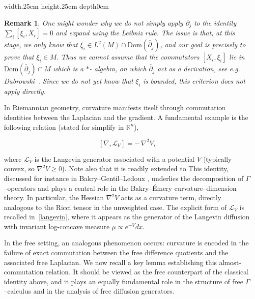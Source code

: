 \documentclass[10pt,a4paper,reqno]{amsart}
\newtheorem{remark}[theorem]{Remark}
\def\qed{ \hfill \vrule width.25cm height.25cm depth0cm\smallskip}
\newcommand{\Dom}{\mathrm{Dom}}
\begin{document}
\qed
\begin{remark}
One might wonder why we do not simply apply $\bar\partial_j$ to the identity
$\sum_i [\xi_i,X_i]=0$ and expand using the Leibniz rule.  The issue is that,
at this stage, we only know that $\xi_i\in L^2(M)\cap\Dom(\bar\partial_j)$, and
our goal is precisely to prove that $\xi_i\in M$.  Thus we cannot assume that
the commutators $[X_i,\xi_i]$ lie in $\Dom(\bar\partial_j)\cap M$ which is a $*$- algebra, on which $\bar\partial_j$ act as a derivation, see e.g. Dabrowski~\cite[Proposition~6]{Dab10}. Since we do not yet know that $\xi_i$ is bounded, this criterion does not apply directly.
\end{remark}

\begin{flushleft}
In Riemannian geometry, curvature manifests itself through commutation identities between the
Laplacian and the gradient.  A fundamental example is the following relation (stated for simplify in $\mathbb R^n$), 


\[
[\nabla, \mathcal{L}_V] = -\,\nabla^2 V,
\]


where $\mathcal{L}_V$ is the Langevin generator associated with a potential $V$ (typically convex, so
$\nabla^2 V\ge 0$). Note also that it is readily extended to   This identity, discussed for instance in Bakry--Gentil--Ledoux
\cite[p.~104]{Ledoux}, underlies the decomposition of $\Gamma$--operators and plays a central role
in the Bakry--Émery curvature--dimension theory.  In particular, the Hessian $\nabla^2 V$ acts as a
curvature term, directly analogous to the Ricci tensor in the unweighted case.  The explicit form of
$\mathcal{L}_V$ is recalled in~\eqref{langevin}, where it appears as the generator of the Langevin diffusion
with invariant log-concave measure $\mu \propto e^{-V}dx$.

\medskip

In the free setting, an analogous phenomenon occurs: curvature is encoded in the failure of exact
commutation between the free difference quotients and the associated free Laplacian.  We now recall
a key lemma establishing this almost-commutation relation.  It should be viewed as the free
counterpart of the classical identity above, and it plays an equally fundamental role in the
structure of free $\Gamma$--calculus and in the analysis of free diffusion generators.

\end{flushleft}
\end{document}
